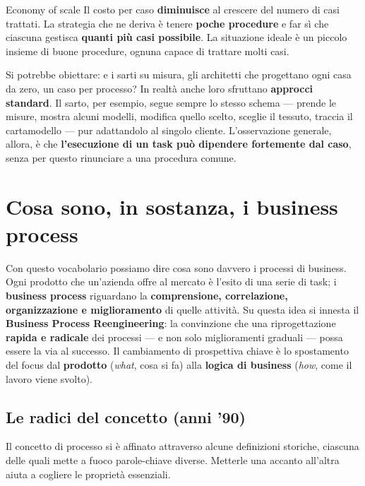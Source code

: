 \begin{boxtip}{Economy of scale}
Il costo per caso \textbf{diminuisce} al crescere del numero di casi trattati. La strategia che ne deriva è tenere \textbf{poche procedure} e far sì che ciascuna gestisca \textbf{quanti più casi possibile}. La situazione ideale è un piccolo insieme di buone procedure, ognuna capace di trattare molti casi.
\end{boxtip}

Si potrebbe obiettare: e i sarti su misura, gli architetti che progettano ogni casa da zero, un caso per processo? In realtà anche loro sfruttano \textbf{approcci standard}. Il sarto, per esempio, segue sempre lo stesso schema — prende le misure, mostra alcuni modelli, modifica quello scelto, sceglie il tessuto, traccia il cartamodello — pur adattandolo al singolo cliente. L'osservazione generale, allora, è che \textbf{l'esecuzione di un task può dipendere fortemente dal caso}, senza per questo rinunciare a una procedura comune.

\section{\texorpdfstring{Cosa sono, in sostanza, i business process}{Cosa sono, in sostanza, i business process}}

Con questo vocabolario possiamo dire cosa sono davvero i processi di business. Ogni prodotto che un'azienda offre al mercato è l'esito di una serie di task; i \textbf{business process} riguardano la \textbf{comprensione, correlazione, organizzazione e miglioramento} di quelle attività. Su questa idea si innesta il \textbf{Business Process Reengineering}: la convinzione che una riprogettazione \textbf{rapida e radicale} dei processi — e non solo miglioramenti graduali — possa essere la via al successo. Il cambiamento di prospettiva chiave è lo spostamento del focus dal \textbf{prodotto} (\emph{what}, cosa si fa) alla \textbf{logica di business} (\emph{how}, come il lavoro viene svolto).

\subsection{\texorpdfstring{Le radici del concetto (anni '90)}{Le radici del concetto (anni '90)}}

Il concetto di processo si è affinato attraverso alcune definizioni storiche, ciascuna delle quali mette a fuoco parole-chiave diverse. Metterle una accanto all'altra aiuta a cogliere le proprietà essenziali.

